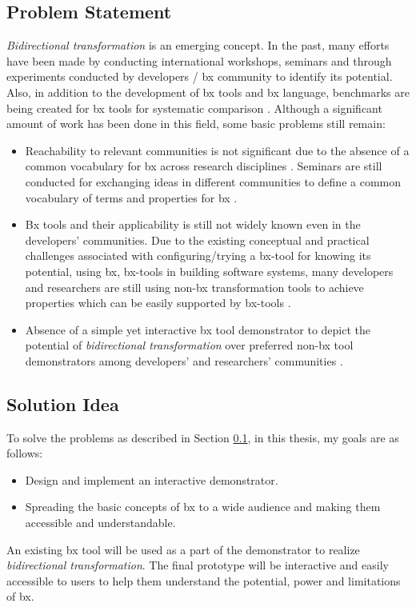 \subsection{Problem Statement}\label{subsec:probstmt}
\textit{Bidirectional transformation} is an emerging concept. In the past, many efforts have been made by conducting international workshops, seminars and through experiments conducted by developers / bx community to identify its potential. Also, in addition to the development of bx tools and bx language, benchmarks are being created for bx tools for systematic comparison \cite{benchmark-BX}.
\newline\newline  Although a significant amount of work has been done in this field, some basic problems still remain:
\begin{itemize}
	\item {Reachability to relevant communities is not significant due to the absence of a common vocabulary for bx across research disciplines \cite{bx-theoryandappl}. Seminars are still conducted for exchanging ideas in different communities to define a common vocabulary of terms and properties for bx \cite{bx-dagstuhl}.}	
	\item {Bx tools and their applicability is still not widely known even in the developers' communities. Due to the existing conceptual and practical challenges associated with configuring/trying a bx-tool for knowing its potential, using bx, bx-tools in building software systems, many developers and researchers are still using non-bx transformation tools to achieve properties which can be easily supported by bx-tools \cite{bx-theoryandappl}.}
	\item {Absence of a simple yet interactive bx tool demonstrator to depict the potential of \textit{bidirectional transformation} over preferred non-bx tool demonstrators among developers' and researchers' communities \cite{bx-theoryandappl}.}
\end{itemize}

\subsection{Solution Idea}\label{subsec:solution}
To solve the problems as described in Section \ref{subsec:probstmt}, in this thesis, my goals are as follows:
\begin{itemize} 
\item {Design and implement an interactive demonstrator.} 
\item {Spreading the basic concepts of bx to a wide audience and making them accessible and understandable.}
\end{itemize}
An existing bx tool will be used as a part of the demonstrator to realize \textit{bidirectional transformation}. The final prototype will be interactive and easily accessible to users to help them understand the potential, power and limitations of bx.

